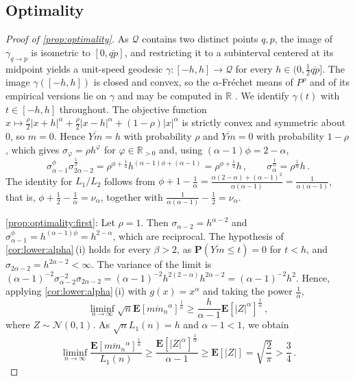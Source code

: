 \documentclass{article}
\newcommand*{\mc}[1]{\mathcal{#1}}
\newcommand{\R}{\mathbb{R}}
\newcommand{\Rpp}{\R_{>0}}
\newcommand{\lab}{\left[} %
\newcommand{\rab}{\right]} %
\newcommand{\ab}[1]{\lab #1 \rab} %
\newcommand{\abOf}[1]{\!\ab{#1}} %
\newcommand{\lb}{\left(} %
\newcommand{\rb}{\right)} %
\newcommand{\br}[1]{\lb #1 \rb} %
\newcommand{\brOf}[1]{\!\br{#1}} %
\newcommand{\absof}[1]{\vert #1 \vert} %
\renewcommand{\Pr}{\mathbf{P}} %
\newcommand{\PrOf}[1]{\Pr\brOf{#1}}
\newcommand{\E}{\mathbf{E}} %
\newcommand{\EOf}[1]{\E\abOf{#1}}
\newcommand{\eqcm}{\,,} %
\newcommand{\eqfs}{\,.}
\newcommand{\ol}[2]{\overline{#1#2}}
\newcommand{\geodft}[2]{\gamma_{#1\to#2}} %
\begin{document}
\subsection{Optimality}
%
\begin{proof}[Proof of \cref{prop:optimality}]
    As $\mc Q$ contains two distinct points $q,p$, the image of $\geodft qp$ is isometric to $[0,\ol qp]$, and restricting it to a subinterval centered at its midpoint yields a unit-speed geodesic $\gamma\colon[-h,h]\to\mc Q$ for every $h \in (0, \frac12 \ol qp]$.
    The image $\gamma([-h,h])$ is closed and convex, so the $\alpha$-Fr\'echet means of $P^\rho$ and of its empirical versions lie on $\gamma$ and may be computed in $\R$ \cite[Proposition 5.2]{varinequ}. We identify $\gamma(t)$ with $t\in[-h,h]$ throughout.
    The objective function $x\mapsto\frac\rho2\absof{x+h}^\alpha + \frac\rho2\absof{x-h}^\alpha + (1-\rho)\absof{x}^\alpha$ is strictly convex and symmetric about $0$, so $m=0$. Hence $\ol Ym = h$ with probability $\rho$ and $\ol Ym = 0$ with probability $1-\rho$, which gives $\sigma_\varphi = \rho h^\varphi$ for $\varphi\in\Rpp$ and, using $(\alpha-1)\phi = 2-\alpha$,
    \begin{equation}
        \sigma_{\alpha-1}^{\phi} \sigma_{2\alpha-2}^{\frac12}
        =
        \rho^{\phi+\frac12}  h^{(\alpha-1)\phi + (\alpha-1)}
        =
        \rho^{\phi+\frac12}  h
        \eqcm\qquad
        \sigma_\alpha^{\frac1\alpha} = \rho^{\frac1\alpha}  h
        \eqfs
    \end{equation}
    The identity for $L_1/L_2$ follows from $\phi + 1 - \frac1\alpha = \frac{\alpha(2-\alpha)+(\alpha-1)^2}{\alpha(\alpha-1)} = \frac1{\alpha(\alpha-1)}$, that is, $\phi + \frac12 - \frac1\alpha = \nu_\alpha$, together with $\frac1{\alpha(\alpha-1)}-\frac12 = \nu_\alpha$.
    
    \ref{prop:optimality:first}:
    Let $\rho=1$. Then $\sigma_{\alpha-2} = h^{\alpha-2}$ and $\sigma_{\alpha-1}^{\phi} = h^{(\alpha-1)\phi} = h^{2-\alpha}$, which are reciprocal.
    The hypothesis of \cref{cor:lower:alpha}\,(i) holds for every $\beta>2$, as $\PrOf{\ol Ym\leq t} = 0$ for $t<h$, and $\sigma_{2\alpha-2} = h^{2\alpha-2}<\infty$.
    The variance of the limit is $(\alpha-1)^{-2}\sigma_{\alpha-2}^{-2}\sigma_{2\alpha-2} = (\alpha-1)^{-2} h^{2(2-\alpha)} h^{2\alpha-2} = (\alpha-1)^{-2} h^2$.
    Hence, applying \cref{cor:lower:alpha}\,(i) with $g(x) = x^\alpha$ and taking the power $\frac1\alpha$,
    \begin{equation}
        \liminf_{n\to\infty} \sqrt n  \EOf{\ol m{m_n}^\alpha}^{\frac1\alpha}
        \geq
        \frac{h}{\alpha-1} \EOf{\absof{Z}^\alpha}^{\frac1\alpha}
        \eqcm
    \end{equation}
    where $Z\sim\mc N(0,1)$.
    As $\sqrt n  L_1(n) = h$ and $\alpha - 1 < 1$, we obtain
    \begin{equation}
        \liminf_{n\to\infty} \frac{\EOf{\ol m{m_n}^\alpha}^{\frac1\alpha}}{L_1(n)}
        \geq
        \frac{\EOf{\absof{Z}^\alpha}^{\frac1\alpha}}{\alpha-1}
        \geq
        \EOf{\absof{Z}}
        =
        \sqrt{\frac2\pi}
        >
        \frac34
        \eqfs
    \end{equation}
    

\end{proof}
\end{document}
